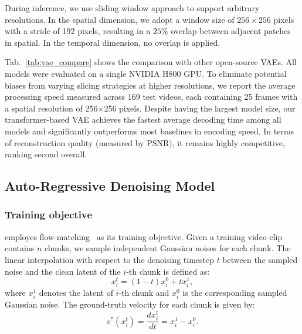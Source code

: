 During inference, we use sliding window approach to support arbitrary resolutions. In the spatial dimension, we adopt a window size of $256\times256$ pixels with a stride of 192 pixels, resulting in a $25\%$ overlap between adjacent patches in spatial. In the temporal dimension, no overlap is applied.


Tab.~\ref{tab:vae_compare} shows the comparison with other open-source VAEs. All models were evaluated on a single NVIDIA H800 GPU. To eliminate potential biases from varying slicing strategies at higher resolutions, we report the average processing speed measured across 169 test videos, each containing 25 frames with a spatial resolution of 256$\times$256 pixels. 
Despite having the largest model size, our transformer-based VAE achieves the fastest average decoding time among all models and significantly outperforms most baselines in encoding speed. In terms of reconstruction quality (measured by PSNR), it remains highly competitive, ranking second overall. 




\subsection{Auto-Regressive Denoising Model}
\subsubsection{Training objective}
\magi employes flow-matching~\citep{albergo2022building,liu2022flow,lipman2022flow} as its training objective. Given a training video clip contains $n$ chunks, we sample independent Gaussian noises for each chunk. The linear interpolation with respect to the denoising timestep $t$ between the sampled noise and the clean latent of the $i$-th chunk is defined as:
\begin{equation}
    x_i^t = (1-t) x_i^0 + t x_i^1,
\end{equation}
where $x_i^1$ denotes the latent of $i$-th chunk and $x_i^0$ is the corresponding sampled Gaussian noise. The ground-truth velocity for each chunk is given by:
\begin{equation}
    v^*(x_i^t) = \frac{d x_i^t}{dt} = x_i^1 - x_i^0.
\end{equation}

